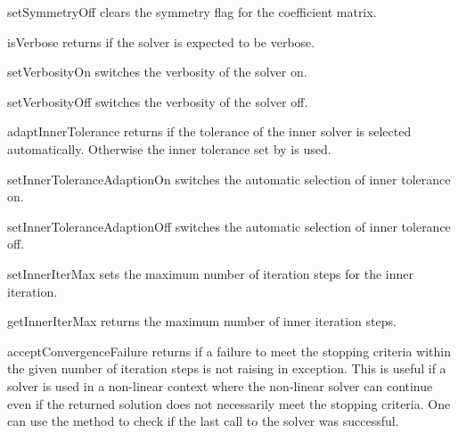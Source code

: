 \begin{methoddesc}[SolverOptions]{setSymmetryOff}{}
clears the symmetry flag for the coefficient matrix.
\end{methoddesc}

\begin{methoddesc}[SolverOptions]{isVerbose}{}
returns \True if the solver is expected to be verbose.
\end{methoddesc}

\begin{methoddesc}[SolverOptions]{setVerbosityOn}{}
switches the verbosity of the solver on.
\end{methoddesc}

\begin{methoddesc}[SolverOptions]{setVerbosityOff}{}
switches the verbosity of the solver off.
\end{methoddesc}

\begin{methoddesc}[SolverOptions]{adaptInnerTolerance}{}
returns \True if the tolerance of the inner solver is selected automatically.
Otherwise the inner tolerance set by  is used.
\end{methoddesc}

\begin{methoddesc}[SolverOptions]{setInnerToleranceAdaptionOn}{}
switches the automatic selection of inner tolerance on.
\end{methoddesc}

\begin{methoddesc}[SolverOptions]{setInnerToleranceAdaptionOff}{}
switches the automatic selection of inner tolerance off.
\end{methoddesc}

\begin{methoddesc}[SolverOptions]{setInnerIterMax}{}
sets the maximum number of iteration steps for the inner iteration.
\end{methoddesc}

\begin{methoddesc}[SolverOptions]{getInnerIterMax}{}
returns the maximum number of inner iteration steps.
\end{methoddesc}

\begin{methoddesc}[SolverOptions]{acceptConvergenceFailure}{}
returns \True if a failure to meet the stopping criteria within the given
number of iteration steps is not raising in exception. This is useful
if a solver is used in a non-linear context where the non-linear solver can
continue even if the returned solution does not necessarily meet the stopping
criteria. One can use the  method to check if the
last call to the solver was successful.
\end{methoddesc}

